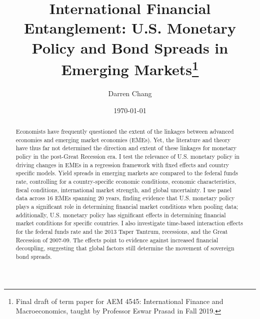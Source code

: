 \documentclass[12pt]{article}
\begin{document}

\newcommand{\tit}{International Financial Entanglement: U.S. Monetary Policy and Bond Spreads in Emerging Markets}

\newcommand{\ack}{Final draft of term paper for AEM 4545: International Finance and Macroeconomics, taught by Professor Eswar Prasad in Fall 2019.}

\newcommand{\abs}{\noindent Economists have frequently questioned the extent of the linkages between advanced economies and  emerging market economies (EMEs). Yet, the literature and theory have thus far not determined the direction and extent of these linkages for monetary policy in the post-Great Recession era. I test the relevance of U.S. monetary policy in driving changes in EMEs in a regression framework with fixed effects and country specific models. Yield spreads in emerging markets are compared to the federal funds rate, controlling for a country-specific economic conditions, economic characteristics, fiscal conditions, international market strength, and global uncertainty. I use panel data across 16 EMEs spanning 20 years, finding evidence that U.S. monetary policy plays a significant role in determining financial market conditions when pooling data; additionally, U.S. monetary policy has significant effects in determining financial market conditions for specific countries. I also investigate time-based interaction effects for the federal funds rate and the 2013 Taper Tantrum, recessions, and the Great Recession of 2007-09. The effects point to evidence against increased financial decoupling, suggesting that global factors still determine the movement of sovereign bond spreads.
}

\title{\tit{\thanks{\ack}}}

\author{Darren Chang}
\date{{\today}}

\maketitle
\thispagestyle{empty}

\begin{abstract}
  \abs  
\end{abstract}

\newpage
\setcounter{page}{1}

\end{document}
